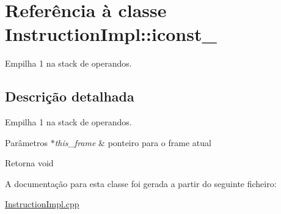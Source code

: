 \hypertarget{class_instruction_impl_1_1iconst__1}{}\section{Referência à classe Instruction\+Impl\+:\+:iconst\+\_}
\label{class_instruction_impl_1_1iconst__1}


Empilha 1 na stack de operandos.  




\subsection{Descrição detalhada}
Empilha 1 na stack de operandos. 


\begin{DoxyParams}{Parâmetros}
{\em $\ast$this\+\_\+frame} & ponteiro para o frame atual \\
\hline
\end{DoxyParams}
\begin{DoxyReturn}{Retorna}
void 
\end{DoxyReturn}


A documentação para esta classe foi gerada a partir do seguinte ficheiro\+:\begin{DoxyCompactItemize}
\item 
\hyperlink{_instruction_impl_8cpp}{Instruction\+Impl.\+cpp}\end{DoxyCompactItemize}
